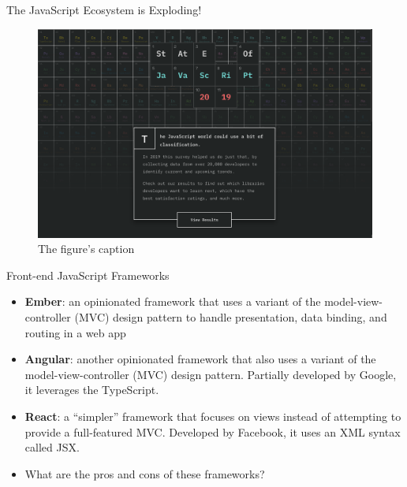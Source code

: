\documentclass[14pt,aspectratio=169]{beamer}
\begin{document}
%
\begin{frame}{The JavaScript Ecosystem is Exploding!}
  \begin{figure}
    \centering
    \includegraphics[scale=.080]{images/stateofjs.png}
    \caption{The figure's caption}
  \end{figure}
\end{frame}

%
\begin{frame}{Front-end JavaScript Frameworks}
  \begin{itemize}
    \item {\bf Ember}: an opinionated framework that uses a variant of the
      model-view-controller (MVC) design pattern to handle presentation, data
      binding, and routing in a web app
      \vspace*{-.15in}
    \item {\bf Angular}: another opinionated framework that also uses a variant
      of the model-view-controller (MVC) design pattern. Partially developed by
      Google, it leverages the TypeScript.
      \vspace*{-.15in}
    \item {\bf React}: a ``simpler'' framework that focuses on views instead of
      attempting to provide a full-featured MVC. Developed by Facebook, it
      uses an XML syntax called JSX.
      \vspace*{-.15in}
    \item What are the pros and cons of these frameworks?
  \end{itemize}
\end{frame}
\end{document}
